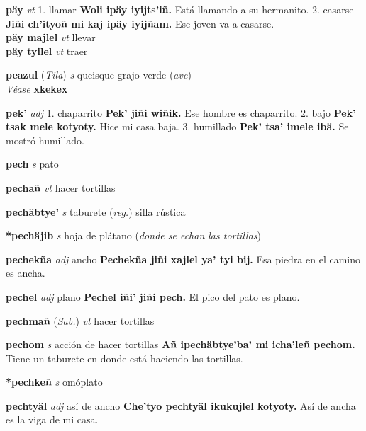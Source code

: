 \documentclass[10pt]{scrbook}
\newcommand{\entry}[1]{\textbf{#1}}
\newcommand{\onedefinition}[1]{#1.}
\newcommand{\partofspeech}[1]{\textit{#1}}
\newcommand{\spanishtranslation}[1]{#1}
\newcommand{\clarification}[1]{(\textit{#1})}
\newcommand{\cholexample}[1]{\textbf{#1}}
\newcommand{\exampletranslation}[1]{#1}
\newcommand{\alsosee}[1]{\\\textit{Véase} \textbf{#1}}
\newcommand{\relevantdialect}[1]{(\textit{#1})}
\newcommand{\secondaryentry}[1]{\\\textbf{#1}}
\newcommand{\secondpartofspeech}[1]{\textit{#1}}
\newcommand{\secondtranslation}[1]{#1}
\begin{document}
\begin{multicols}{2}
\entry{päy}
\partofspeech{vt}
\onedefinition{1}
\spanishtranslation{llamar}
\cholexample{Woli ipäy iyijts'iñ.}
\exampletranslation{Está llamando a su hermanito.}
\onedefinition{2}
\spanishtranslation{casarse}
\cholexample{Jiñi ch'ityoñ mi kaj ipäy iyijñam.}
\exampletranslation{Ese joven va a casarse.}
\secondaryentry{päy majlel}
\secondpartofspeech{vt}
\secondtranslation{llevar}
\secondaryentry{päy tyilel}
\secondpartofspeech{vt}
\secondtranslation{traer}

\entry{peazul}
\relevantdialect{Tila}
\partofspeech{s}
\spanishtranslation{queisque}
\spanishtranslation{grajo verde}
\clarification{ave}
\alsosee{xkekex}

\entry{pek'}
\partofspeech{adj}
\onedefinition{1}
\spanishtranslation{chaparrito}
\cholexample{Pek' jiñi wiñik.}
\exampletranslation{Ese hombre es chaparrito.}
\onedefinition{2}
\spanishtranslation{bajo}
\cholexample{Pek' tsak mele kotyoty.}
\exampletranslation{Hice mi casa baja.}
\onedefinition{3}
\spanishtranslation{humillado}
\cholexample{Pek' tsa' imele ibä.}
\exampletranslation{Se mostró humillado.}

\entry{pech}
\partofspeech{s}
\spanishtranslation{pato}

\entry{pechañ}
\partofspeech{vt}
\spanishtranslation{hacer tortillas}

\entry{pechäbtye'}
\partofspeech{s}
\spanishtranslation{taburete}
\clarification{reg.}
\spanishtranslation{silla rústica}

\entry{*pechäjib}
\partofspeech{s}
\spanishtranslation{hoja de plátano}
\clarification{donde se echan las tortillas}

\entry{pechekña}
\partofspeech{adj}
\spanishtranslation{ancho}
\cholexample{Pechekña jiñi xajlel ya' tyi bij.}
\exampletranslation{Esa piedra en el camino es ancha.}

\entry{pechel}
\partofspeech{adj}
\spanishtranslation{plano}
\cholexample{Pechel iñi' jiñi pech.}
\exampletranslation{El pico del pato es plano.}

\entry{pechmañ}
\relevantdialect{Sab.}
\partofspeech{vt}
\spanishtranslation{hacer tortillas}

\entry{pechom}
\partofspeech{s}
\spanishtranslation{acción de hacer tortillas}
\cholexample{Añ ipechäbtye'ba' mi icha'leñ pechom.}
\exampletranslation{Tiene un taburete en donde está haciendo las tortillas.}

\entry{*pechkeñ}
\partofspeech{s}
\spanishtranslation{omóplato}

\entry{pechtyäl}
\partofspeech{adj}
\spanishtranslation{así de ancho}
\cholexample{Che'tyo pechtyäl ikukujlel kotyoty.}
\exampletranslation{Así de ancha es la viga de mi casa.}


\end{multicols}
\end{document}
